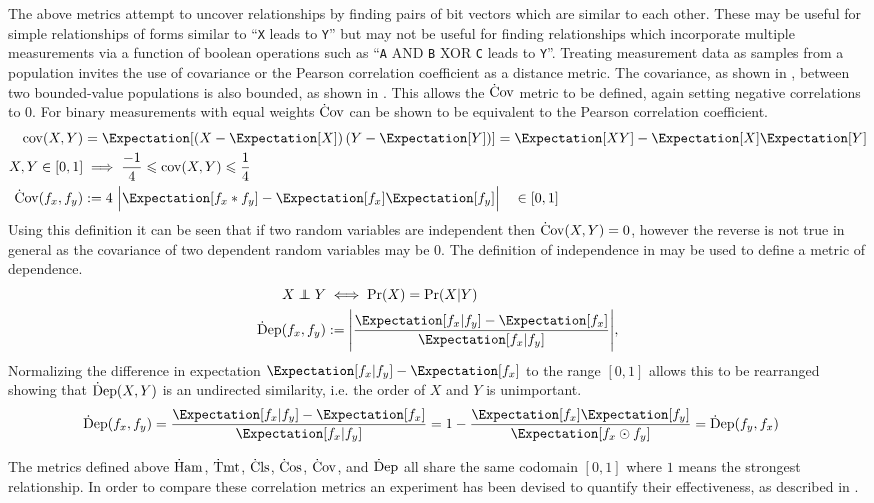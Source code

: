 \documentclass[runningheads]{llncs}
\begin{document}
The above metrics attempt to uncover relationships by finding pairs of
bit vectors which are similar to each other.
These may be useful for simple relationships of forms similar to
``\texttt{X} leads to \texttt{Y}'' but may not be useful for finding
relationships which incorporate multiple measurements via a function of boolean
operations such as
``\texttt{A} AND \texttt{B} XOR \texttt{C} leads to \texttt{Y}''.
Treating measurement data as samples from a population invites the use of
covariance or the Pearson correlation coefficient as a distance metric.
The covariance, as shown in , between two bounded-value
populations is also bounded, as shown in .
This allows the $\operatorname{\dot{C}ov}$ metric to be defined, again setting negative correlations
to $0$.
For binary measurements with equal weights $\operatorname{\dot{C}ov}$ can be shown to be
equivalent to the Pearson correlation coefficient.
\begin{align}
\label{eq:covariance}
\cov(X, Y) &= \sEx{ \left(X-\sEx{X}\right) \left(Y-\sEx{Y}\right) }
  = \sEx{XY} - \sEx{X} \sEx{Y}
\\
\label{eq:covariance_limits}
X,Y \in [0,1] &\implies \frac{-1}{4} \leq \cov(X,Y) \leq \frac{1}{4}
\\
\label{eq:def_Cov}
\sCov{f_x}{f_y} &:= 4\ \Big| \sEx{f_x * f_y} - \sEx{f_x} \sEx{f_y} \Big|
\quad \in [0,1]
\end{align}
Using this definition it can be seen that if two random variables are
independent then $\operatorname{\dot{C}ov}(X,Y) = 0$, however the reverse is not true in general
as the covariance of two dependent random variables may be $0$.
The definition of independence in  may be used to define
a metric of dependence.
\begin{align}
\label{eq:independence}
X \indep Y &\iff \Pr(X) = \Pr(X|Y)
\\
\label{eq:def_Dep}
\sDep{f_x}{f_y} &:=
  \Bigg| \frac{\sEx{f_x | f_y} - \sEx{f_x}}{\sEx{f_x | f_y}} \Bigg|,
\end{align}
Normalizing the difference in expectation
$\sEx{f_x | f_y} - \sEx{f_x}$
to the range $[0,1]$ allows this to be rearranged showing that $\operatorname{\dot{D}ep}(X,Y)$
is an undirected similarity, i.e. the order of $X$ and $Y$ is unimportant.
\begin{align}
\Dep(f_x, f_y) &=
  \frac{\sEx{f_x | f_y} - \sEx{f_x}}{\sEx{f_x | f_y}}
  = 1 - \frac{\sEx{f_x} \sEx{f_y}} {\sEx{f_x \odot f_y}}
  = \Dep(f_y, f_x)
\end{align}

The metrics defined above $\operatorname{\dot{H}am}$, $\operatorname{\dot{T}mt}$, $\operatorname{\dot{C}ls}$, $\operatorname{\dot{C}os}$,
$\operatorname{\dot{C}ov}$, and $\operatorname{\dot{D}ep}$ all share the same codomain $[0,1]$ where $1$ means
the strongest relationship.
In order to compare these correlation metrics an experiment has been devised
to quantify their effectiveness, as described in .
\end{document}
